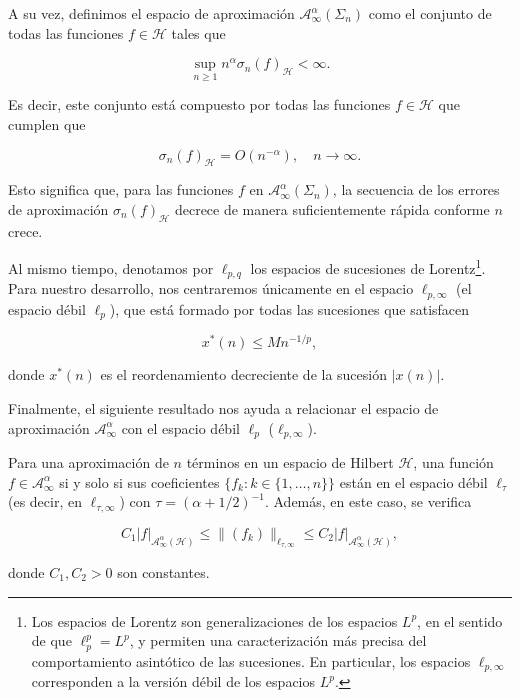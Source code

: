 A su vez, definimos el espacio de aproximación $\mathcal{A}_{\infty}^{\alpha}(\Sigma_n)$ como el conjunto de todas las funciones $f \in \mathcal{H}$ tales que

\[
    \sup_{n \geq 1} n^{\alpha} \sigma_n(f)_{\mathcal{H}} < \infty.
\]

Es decir, este conjunto está compuesto por todas las funciones $f \in \mathcal{H}$ que cumplen que

\[
    \sigma_n(f)_{\mathcal{H}} = O(n^{-\alpha}), \quad n \to \infty.
\]

Esto significa que, para las funciones $f$ en $\mathcal{A}_{\infty}^{\alpha}(\Sigma_n)$, la secuencia de los errores de aproximación $\sigma_n(f)_{\mathcal{H}}$ decrece de manera suficientemente rápida conforme $n$ crece.\newline

Al mismo tiempo, denotamos por $\ell_{p,q}$ los espacios de sucesiones de Lorentz\footnote{Los espacios de Lorentz son generalizaciones de los espacios $L^{p}$, en el sentido de que $\ell_{p}^{p} = L^{p}$, y permiten una caracterización más precisa del comportamiento asintótico de las sucesiones. En particular, los espacios $\ell_{p,\infty}$ corresponden a la versión débil de los espacios $L^{p}$.}. Para nuestro desarrollo, nos centraremos únicamente en el espacio $\ell_{p,\infty}$ (el espacio débil $\ell_{p}$), que está formado por todas las sucesiones que satisfacen

\[
    x^{*}(n) \leq M n^{-1/p},
\]

donde $x^{*}(n)$ es el reordenamiento decreciente de la sucesión $|x(n)|$.\newline

Finalmente, el siguiente resultado nos ayuda a relacionar el espacio de aproximación $\mathcal{A}_{\infty}^{\alpha}$ con el espacio débil $\ell_p$ ($\ell_{p,\infty}$).

\begin{teorema}\label{teo:espaciosapprox-espacioslorentz}
    Para una aproximación de $n$ términos en un espacio de Hilbert $\mathcal{H}$, una función $f \in \mathcal{A}_{\infty}^{\alpha}$ si y solo si sus coeficientes $\{ f_k : k \in \{1, \ldots, n\}\}$ están en el espacio débil $\ell_{\tau}$ (es decir, en $\ell_{\tau, \infty}$) con $\tau = (\alpha + 1/2)^{-1}$. Además, en este caso, se verifica

    \[
        C_1 |f|_{\mathcal{A}_{\infty}^{\alpha}(\mathcal{H})} \leq \| (f_k) \|_{\ell_{\tau, \infty}} \leq C_2 |f|_{\mathcal{A}_{\infty}^{\alpha}(\mathcal{H})},
    \]

    donde $C_1, C_2 > 0$ son constantes.\newline
\end{teorema}

